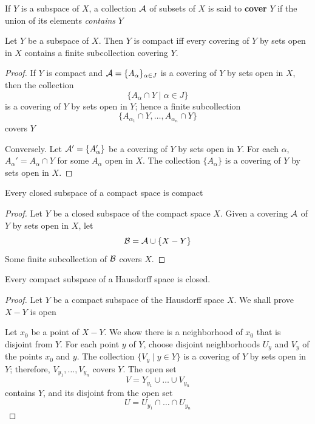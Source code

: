 \documentclass[11pt]{article}
\begin{document}
If \(Y\) is a subspace of \(X\), a collection \(\mathcal{A}\) of subsets of \(X\) is said to \textbf{cover} \(Y\) if
the union of its elements \emph{contains} \(Y\)

\begin{lemma}[]
Let \(Y\) be a subspace of \(X\). Then \(Y\) is compact iff every covering of \(Y\) by sets open
in \(X\) contains a finite subcollection covering \(Y\).
\end{lemma}

\begin{proof}
If \(Y\) is compact and \(\mathcal{A}=\{A_\alpha\}_{\alpha\in J}\) is a covering of \(Y\) by sets open in \(X\), then the
collection
\begin{equation*}
\{A_\alpha\cap Y\mid \alpha\in J\}
\end{equation*}
is a covering of \(Y\) by sets open in \(Y\); hence a finite subcollection
\begin{equation*}
\{A_{\alpha_1}\cap Y,\dots,A_{\alpha_n}\cap Y\}
\end{equation*}
covers \(Y\)

Conversely. Let \(\mathcal{A}'=\{A'_\alpha\}\) be a covering of \(Y\) by sets open in \(Y\). For each
\(\alpha\), \(A_\alpha'=A_\alpha\cap Y\) for some \(A_\alpha\) open in \(X\). The
collection \(\{A_\alpha\}\) is a covering of \(Y\) by sets open in \(X\).
\end{proof}

\begin{theorem}[]
\label{thm26.2}
Every closed subspace of a compact space is compact
\end{theorem}

\begin{proof}
Let \(Y\) be a closed subspace of the compact space \(X\). Given a covering \(\mathcal{A}\) of \(Y\) by
sets open in \(X\), let
\begin{equation*}
\mathcal{B}=\mathcal{A}\cup\{X-Y\}
\end{equation*}
Some finite subcollection of \(\mathcal{B}\) covers \(X\).
\end{proof}

\begin{theorem}[]
\label{thm26.3}
Every compact subspace of a Hausdorff space is closed.
\end{theorem}

\begin{proof}
Let \(Y\) be a compact subspace of the Hausdorff space \(X\). We shall prove \(X-Y\) is open

Let \(x_0\) be a point of \(X-Y\). We show there is a neighborhood of \(x_0\) that is disjoint
from \(Y\). For each point \(y\) of \(Y\), choose disjoint neighborhoods \(U_y\) and \(V_y\) of
the points \(x_0\) and \(y\). The collection \(\{V_y\mid y\in Y\}\) is a covering of \(Y\) by sets open
in \(Y\); therefore, \(V_{y_1},\dots,V_{y_n}\) covers \(Y\). The open set
\begin{equation*}
V=Y_{y_1}\cup\dots\cup V_{y_n}
\end{equation*}
contains \(Y\), and its disjoint from the open set
\begin{equation*}
U=U_{y_1}\cap\dots\cap U_{y_n}
\end{equation*}
\end{proof}
\end{document}
